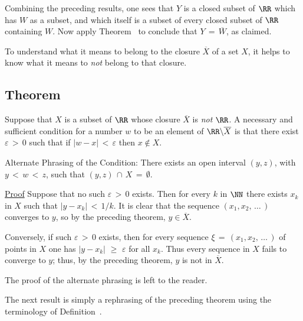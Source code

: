 {        Combining the preceding results, one sees that $Y$ is a closed subset of ${\RR}$ which has $W$ as a subset,
    and which itself is a subset of every closed subset of ${\RR}$ containing $W$.
    Now apply Theorem~ to conclude that $Y \,=\, \overline{W}$, as claimed.
    


\V

        To understand what it means to belong to the closure $\overline{X}$ of a set $X$,
    it helps to know what it means to {\em not} belong to that closure.

\V

            \subsection{\small{\bf Theorem}}
            \label{ThmC80.75}

        Suppose that $X$ is a subset of ${\RR}$ whose closure $\overline{X}$ is {\em not} ${\RR}$.
    A necessary and sufficient condition for a number $w$ to be an element of ${\RR}{\setminus}\overline{X}$ is that there exist ${\varepsilon}\,>\,0$ such that if $|w-x|\,<\,{\varepsilon}$ then $x \not \in X$.
 
        Alternate Phrasing of the Condition: There exists an open interval $(y,z)$, with $y\,<\,w\,<\,z$, such that $(y,z)\,{\cap}\,X \,=\, {\emptyset}$.

\V

        \underline{Proof} Suppose that no such ${\varepsilon}\,>\,0$ exists. 
    Then for every $k$ in ${\NN}$ there exists $x_{k}$ in $X$ such that $|y-x_{k}|\,<\,1/k$.
    It is clear that the sequence $(x_{1},x_{2},\,{\ldots}\,)$ converges to $y$, so by the preceding theorem, $y{\in}\overline{X}$.

        Conversely, if such ${\varepsilon}\,>\,0$ exists, then for every sequence ${\xi} \,=\, (x_{1},x_{2},\,{\ldots}\,)$ of points in $X$ one has $|y-x_{k}|\,\,{\geq}\,\,{\varepsilon}$ for all $x_{k}$.
    Thus every sequence in $X$ fails to converge to $y$; thus, by the preceding theorem, $y$ is not in $\overline{X}$.

        The proof of the alternate phrasing is left to the reader.

\V

        The next result is simply a rephrasing of the preceding theorem using the terminology of Definition~.

\V

}
